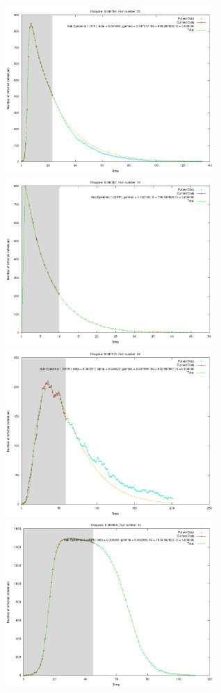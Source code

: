 \begin{centering}
\begin{figure}[h!]
  \includegraphics[width=8cm]{images/single/sir1.png}
  \includegraphics[width=8cm]{images/single/exp1.png}
  \includegraphics[width=8cm]{images/single/seir1.png}
  \includegraphics[width=8cm]{images/single/irsir1.png}

\end{figure}
\end{centering}
